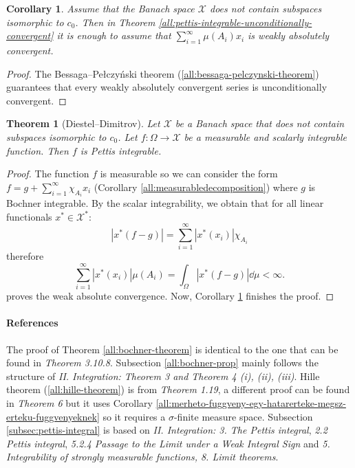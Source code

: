 \documentclass[a4paper, 12pt]{article}
\newtheorem{theo}[lem]{Theorem}
\newtheorem{corollary}[lem]{Corollary}
\begin{document}
\begin{corollary}\label{all:weakly-absolutely-convergent-pettis-integrable} Assume that the Banach space $\mathcal{X}$ does not contain subspaces isomorphic to $c_0$. Then in Theorem \ref{all:pettis-integrable-unconditionally-convergent} it is enough to assume that $\sum^{\infty}_{i=1}\mu(A_i) x_i$ is weakly absolutely convergent.
\end{corollary}
\begin{proof} The Bessaga\---Pełczyński theorem (\ref{all:bessaga-pelczynski-theorem}) guarantees that every weakly absolutely convergent series is unconditionally convergent.
\end{proof}
\begin{theo}[Diestel\---Dimitrov] Let $\mathcal{X}$ be a Banach space that does not contain subspaces isomorphic to $c_0$. Let $f\colon \Omega \to \mathcal{X}$ be a measurable and scalarly integrable function. Then $f$ is Pettis integrable.
\end{theo}
\begin{proof} The function $f$ is measurable so we can consider the form $f = g + \sum^{\infty}_{i=1} \chi_{A_i} x_i$ (Corollary \ref{all:measurabledecomposition}) where $g$ is Bochner integrable. By the scalar integrability, we obtain that for all linear functionals $x^* \in \mathcal{X}^*$:
$$
|x^*(f-g)| = \sum^{\infty}_{i=1} | x^*(x_i) | \chi_{A_i}
$$
therefore
$$
\sum^{\infty}_{i=1} | x^*(x_i) | \mu(A_i) = \int_{\Omega} |x^*(f-g)| \dd{\mu} < \infty.
$$
proves the weak absolute convergence. Now, Corollary \ref{all:weakly-absolutely-convergent-pettis-integrable} finishes the proof.
\end{proof}
\paragraph*{References} The proof of Theorem \ref{all:bochner-theorem} is identical to the one that can be found in \cite{denkowski-migorski-papageorgiou} \textit{Theorem 3.10.8}. Subsection \ref{all:bochner-prop} mainly follows the structure of \cite{diestel-uhl} \textit{II. Integration: Theorem 3 and Theorem 4 (i), (ii), (iii)}. Hille theorem (\ref{all:hille-theorem}) is from \cite{neerven} \textit{Theorem 1.19}, a different proof can be found in \cite{diestel-uhl} \textit{Theorem 6} but it uses Corollary \ref{all:merheto-fuggveny-egy-hatarerteke-megsz-erteku-fuggvenyeknek} so it requires a $\sigma$-finite measure space. Subsection \ref{subsec:pettis-integral} is based on \cite{diestel-uhl} \textit{II. Integration: 3. The Pettis integral}, \cite{schwabik} \textit{2.2 Pettis integral}, \cite{pugachev-sinitsyn} \textit{5.2.4 Passage to the Limit under a Weak Integral Sign} and \cite{musial1991} \textit{5. Integrability of strongly measurable functions, 8. Limit theorems}.
\end{document}
